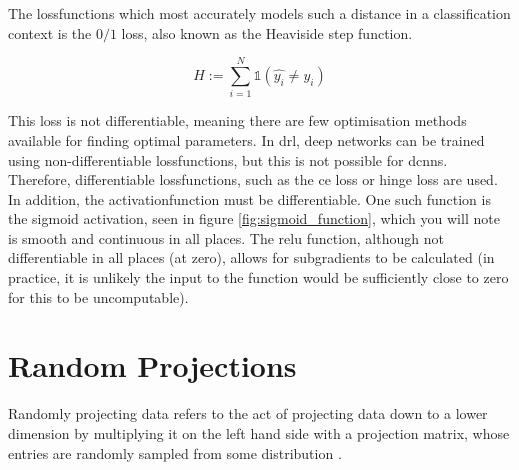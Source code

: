 The \gls{lossfunction}s which most accurately models such a distance in a classification context is the $0/1$ loss, also known as the Heaviside step function.

\begin{equation}
H := \sum_{i = 1}^N \mathds{1} (\hat{y_i} \neq y_i)  
\end{equation}

This loss is not differentiable, meaning there are few optimisation methods available for finding optimal parameters. In \gls{drl}, deep networks can be trained using non-differentiable \gls{lossfunction}s, but this is not possible for \gls{dcnn}s. Therefore, differentiable \gls{lossfunction}s, such as the \gls{ce} loss or hinge loss are used. In addition, the \gls{activationfunction} must be differentiable. One such function is the sigmoid activation, seen in figure \ref{fig:sigmoid_function}, which you will note is smooth and continuous in all places. The \gls{relu} function, although not differentiable in all places (at zero), allows for subgradients to be calculated (in practice, it is unlikely the input to the function would be sufficiently close to zero for this to be uncomputable).
\bigskip



%
%
%

\section{Random Projections}

Randomly projecting data refers to the act of projecting data down to a lower dimension by multiplying it on the left hand side with a projection matrix, whose entries are randomly sampled from some distribution \cite{bob_learning_high_dim}.



